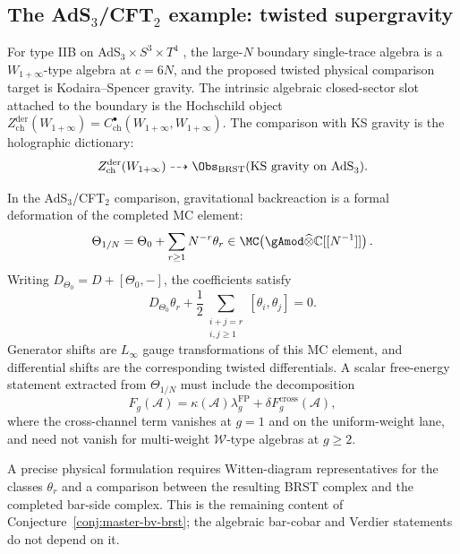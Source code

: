 \subsection{\texorpdfstring{The AdS$_3$/CFT$_2$ example: twisted supergravity}{The AdS 3/CFT 2 example: twisted supergravity}}

\begin{example}\label{ex:AdS3}
For type IIB on AdS$_3 \times S^3 \times T^4$ \cite{CP2020}, the
large-$N$ boundary single-trace algebra is a
$W_{1+\infty}$-type algebra at $c=6N$, and the proposed twisted
physical comparison target is Kodaira--Spencer gravity.  The intrinsic algebraic
closed-sector slot attached to the boundary is the Hochschild object
$Z^{\mathrm{der}}_{\mathrm{ch}}(W_{1+\infty})
=C^\bullet_{\mathrm{ch}}(W_{1+\infty},W_{1+\infty})$.
The comparison with KS gravity is the holographic dictionary:
\[
Z^{\mathrm{der}}_{\mathrm{ch}}(W_{1+\infty})
\dashrightarrow
\Obs_{\mathrm{BRST}}(\mathrm{KS\ gravity\ on\ AdS}_3).
\]
\end{example}

\begin{conjecture}\label{conj:backreaction}
In the AdS$_3$/CFT$_2$ comparison, gravitational backreaction is a
formal deformation of the completed MC element:
\[
\Theta_{1/N}
=
\Theta_0+\sum_{r\ge1}N^{-r}\theta_r
\in
\MC\!\left(\gAmod\widehat{\otimes}\mathbb C[[N^{-1}]]\right).
\]
Writing $D_{\Theta_0}=D+[\Theta_0,-]$, the coefficients satisfy
\[
D_{\Theta_0}\theta_r
+\frac12\sum_{\substack{i+j=r\\i,j\ge1}}[\theta_i,\theta_j]=0.
\]
Generator shifts are $L_\infty$ gauge transformations of this MC
element, and differential shifts are the corresponding twisted
differentials.  A scalar free-energy statement extracted from
$\Theta_{1/N}$ must include the decomposition
\[
F_g(\mathcal A)
=
\kappa(\mathcal A)\lambda_g^{\mathrm{FP}}
+\delta F_g^{\mathrm{cross}}(\mathcal A),
\]
where the cross-channel term vanishes at $g=1$ and on the
uniform-weight lane, and need not vanish for multi-weight
$\mathcal W$-type algebras at $g\ge2$.
\end{conjecture}

A precise physical formulation requires Witten-diagram representatives
for the classes $\theta_r$ and a comparison between the resulting
BRST complex and the completed bar-side complex.  This is the
remaining content of Conjecture~\ref{conj:master-bv-brst}; the
algebraic bar-cobar and Verdier statements do not depend on it.

